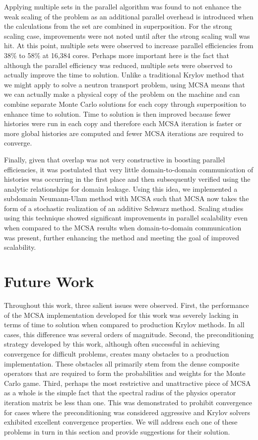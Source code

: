 Applying multiple sets in the parallel algorithm was found to not
enhance the weak scaling of the problem as an additional parallel
overhead is introduced when the calculations from the set are combined
in superposition. For the strong scaling case, improvements were not
noted until after the strong scaling wall was hit. At this point,
multiple sets were observed to increase parallel efficiencies from
38\% to 58\% at 16,384 cores. Perhaps more important here is the fact
that although the parallel efficiency was reduced, multiple sets were
observed to actually improve the time to solution. Unlike a
traditional Krylov method that we might apply to solve a neutron
transport problem, using MCSA means that we can actually make a
physical copy of the problem on the machine and can combine separate
Monte Carlo solutions for each copy through superposition to enhance
time to solution. Time to solution is then improved because fewer
histories were run in each copy and therefore each MCSA iteration is
faster or more global histories are computed and fewer MCSA iterations
are required to converge.

Finally, given that overlap was not very constructive in boosting
parallel efficiencies, it was postulated that very little
domain-to-domain communication of histories was occurring in the first
place and then subsequently verified using the analytic relationships
for domain leakage. Using this idea, we implemented a subdomain
Neumann-Ulam method with MCSA such that MCSA now takes the form of a
stochastic realization of an additive Schwarz method. Scaling studies
using this technique showed significant improvements in parallel
scalability even when compared to the MCSA results when
domain-to-domain communication was present, further enhancing the
method and meeting the goal of improved scalability.

\section{Future Work\ }
\label{sec:future_work}

Throughout this work, three salient issues were observed. First, the
performance of the MCSA implementation developed for this work was
severely lacking in terms of time to solution when compared to
production Krylov methods. In all cases, this difference was several
orders of magnitude. Second, the preconditioning strategy developed by
this work, although often successful in achieving convergence for
difficult problems, creates many obstacles to a production
implementation. These obstacles all primarily stem from the dense
composite operators that are required to form the probabilities and
weights for the Monte Carlo game. Third, perhaps the most restrictive
and unattractive piece of MCSA as a whole is the simple fact that the
spectral radius of the physics operator iteration matrix be less than
one. This was demonstrated to prohibit convergence for cases where the
preconditioning was considered aggressive and Krylov solvers exhibited
excellent convergence properties. We will address each one of these
problems in turn in this section and provide suggestions for their
solution.

